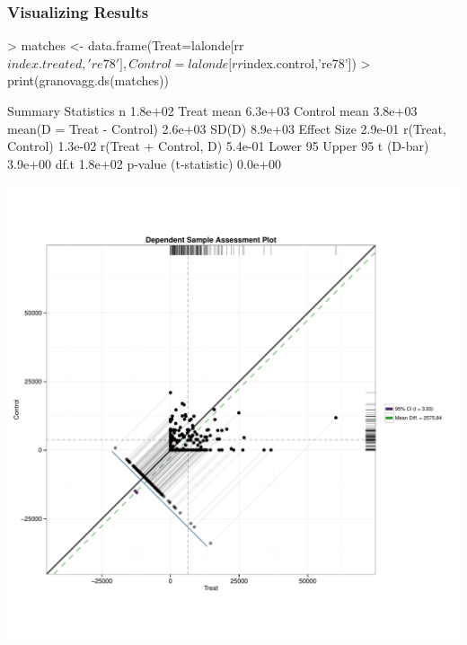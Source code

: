 \documentclass[10pt,slidestop,mathserif,c]{beamer}
\begin{document}
\begin{frame}
    \frametitle{Visualizing Results}
\begin{Schunk}
\begin{Sinput}
> matches <- data.frame(Treat=lalonde[rr$index.treated,'re78'], 
   Control=lalonde[rr$index.control,'re78'])
> print(granovagg.ds(matches))
\end{Sinput}
\begin{Soutput}
                              Summary Statistics
n                                        1.8e+02
Treat mean                               6.3e+03
Control mean                             3.8e+03
mean(D = Treat - Control)                2.6e+03
SD(D)                                    8.9e+03
Effect Size                              2.9e-01
r(Treat, Control)                        1.3e-02
r(Treat + Control, D)                    5.4e-01
Lower 95%
Upper 95%
t (D-bar)                                3.9e+00
df.t                                     1.8e+02
p-value (t-statistic)                    0.0e+00
\end{Soutput}
\end{Schunk}
\end{frame}

\begin{frame}
    \begin{center}
        \includegraphics{figures/Slides-granovaggds}
    \end{center}
\end{frame}
\end{document}
